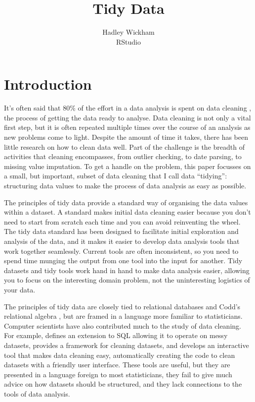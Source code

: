 \documentclass[article]{jss}
\author{Hadley Wickham\\RStudio}
\title{Tidy Data}
\begin{document}
\maketitle

\section{Introduction}

It's often said that 80\% of the effort in a data analysis is spent on data cleaning \citep{dasu:2003}, the process of getting the data ready to analyse. Data cleaning is not only a vital first step, but it is often repeated multiple times over the course of an analysis as new problems come to light. Despite the amount of time it takes, there has been little research on how to clean data well. Part of the challenge is the breadth of activities that cleaning encompasses, from outlier checking, to date parsing, to missing value imputation. To get a handle on the problem, this paper focusses on a small, but important, subset of data cleaning that I call data ``tidying'': structuring data values to make the process of data analysis as easy as possible.

The principles of tidy data provide a standard way of organising the data values within a dataset. A standard makes initial data cleaning easier because you don't need to start from scratch each time and you can avoid reinventing the wheel. The tidy data standard has been designed to facilitate initial exploration and analysis of the data, and it makes it easier to develop data analysis tools that work together seamlessly. Current tools are often inconsistent, so you need to spend time munging the output from one tool into the input for another. Tidy datasets and tidy tools work hand in hand to make data analysis easier, allowing you to focus on the interesting domain problem, not the uninteresting logistics of your data.

The principles of tidy data are closely tied to relational databases and Codd's relational algebra \citep{codd:1990}, but are framed in a language more familiar to statisticians. Computer scientists have also contributed much to the study of data cleaning. For example, \citet{lakshmanan:1996} defines an extension to SQL allowing it to operate on messy datasets, \citet{raman:2001} provides a framework for cleaning datasets, and \citet{kandel:2011} develops an interactive tool that makes data cleaning easy, automatically creating the code to clean datasets with a friendly user interface. These tools are useful, but they are presented in a language foreign to most statisticians, they fail to give much advice on how datasets should be structured, and they lack connections to the tools of data analysis.
\end{document}
